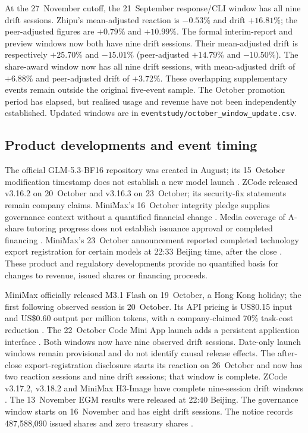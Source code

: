 \documentclass[11pt]{article}
\begin{document}
At the 27~November cutoff, the 21~September response/CLI window has all nine drift sessions. Zhipu's mean-adjusted reaction is $-0.53\%$ and drift $+16.81\%$; the peer-adjusted figures are $+0.79\%$ and $+10.99\%$. The formal interim-report and preview windows now both have nine drift sessions. Their mean-adjusted drift is respectively $+25.70\%$ and $-15.01\%$ (peer-adjusted $+14.79\%$ and $-10.50\%$). The share-award window now has all nine drift sessions, with mean-adjusted drift of $+6.88\%$ and peer-adjusted drift of $+3.72\%$. These overlapping supplementary events remain outside the original five-event sample. The October promotion period has elapsed, but realised usage and revenue have not been independently established. Updated windows are in \texttt{eventstudy/october\_window\_update.csv}.

\subsection{Product developments and event timing}
The official GLM-5.3-BF16 repository was created in August; its 15~October modification timestamp does not establish a new model launch \citep{glmrepo2026}. ZCode released v3.16.2 on 20~October and v3.16.3 on 23~October; its security-fix statements remain company claims. MiniMax's 16~October integrity pledge supplies governance context without a quantified financial change \citep{minimaxpledge2026}. Media coverage of A-share tutoring progress does not establish issuance approval or completed financing \citep{minimaxtutoring2026}. MiniMax's 23~October announcement reported completed technology export registration for certain models at 22:33 Beijing time, after the close \citep{minimaxexport2026}. These product and regulatory developments provide no quantified basis for changes to revenue, issued shares or financing proceeds.

MiniMax officially released M3.1 Flash on 19~October, a Hong Kong holiday; the first following observed session is 20~October. Its API pricing is US\$0.15 input and US\$0.60 output per million tokens, with a company-claimed 70\% task-cost reduction \citep{minimaxflash2026}. The 22~October Code Mini App launch adds a persistent application interface \citep{minimaxminiapp2026}. Both windows now have nine observed drift sessions. Date-only launch windows remain provisional and do not identify causal release effects. The after-close export-registration disclosure starts its reaction on 26~October and now has two reaction sessions and nine drift sessions; that window is complete. ZCode v3.17.2, v3.18.2 and MiniMax H3-Image have complete nine-session drift windows \citep{novemberproducts2026}. The 13~November EGM results were released at 22:40 Beijing. The governance window starts on 16~November and has eight drift sessions. The notice records 487,588,090 issued shares and zero treasury shares \citep{zhipuegm2026}.
\end{document}
